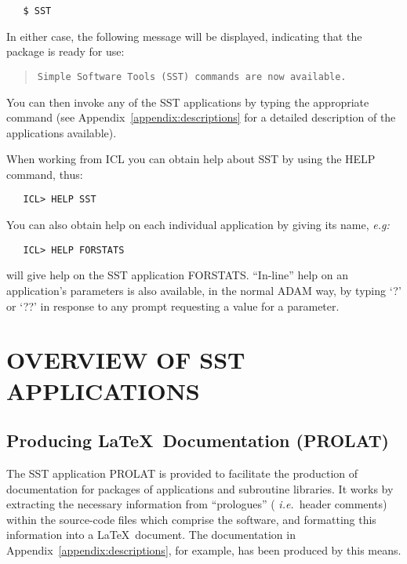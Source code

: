 \begin{verbatim}
   $ SST
\end{verbatim}

In either case, the following message will be displayed, indicating that the
package is ready for use: 

\begin{quote}
{\tt Simple Software Tools (SST) commands are now available.}
\end{quote}

You can then invoke any of the SST applications by typing the appropriate
command (see Appendix~\ref{appendix:descriptions} for a detailed description
of the applications available). 

When working from ICL you can obtain help about SST by using the HELP command,
thus: 

\begin{verbatim}
   ICL> HELP SST
\end{verbatim}

You can also obtain help on each individual application by giving its name,
{\em e.g:}

\begin{verbatim}
   ICL> HELP FORSTATS
\end{verbatim}

will give help on the SST application FORSTATS.
``In-line'' help on an application's parameters is also available, in the
normal ADAM way, by typing `?' or `??' in response to any prompt requesting a
value for a parameter.


\section{OVERVIEW OF SST APPLICATIONS}

\subsection{Producing \LaTeX\ Documentation (PROLAT)}

The SST application PROLAT is provided to facilitate the production of
documentation for packages of applications and subroutine libraries. 
It works by extracting the necessary information from ``prologues'' ({\em
i.e.}\ header comments) within the source-code files which comprise the
software, and formatting this information into a \LaTeX\ document. 
The documentation in Appendix~\ref{appendix:descriptions}, for example, has
been produced by this means. 

